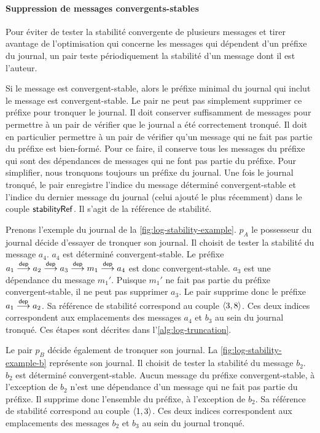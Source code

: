 \paragraph{Suppression de messages convergents-stables}
Pour éviter de tester la stabilité convergente de plusieurs messages et tirer avantage de l'optimisation qui concerne les messages qui dépendent d'un préfixe du journal, un pair teste périodiquement la stabilité d'un message dont il est l'auteur.

Si le message est convergent-stable, alors le préfixe minimal du journal qui inclut le message est convergent-stable.
Le pair ne peut pas simplement supprimer ce préfixe pour tronquer le journal.
Il doit conserver suffisamment de messages pour permettre à un pair de vérifier que le journal a été correctement tronqué.
Il doit en particulier permettre à un pair de vérifier qu'un message qui ne fait pas partie du préfixe est bien-formé.
Pour ce faire, il conserve tous les messages du préfixe qui sont des dépendances de messages qui ne font pas partie du préfixe.
Pour simplifier, nous tronquons toujours un préfixe du journal.
Une fois le journal tronqué, le pair enregistre l'indice du message déterminé convergent-stable et l'indice du dernier message du journal (celui ajouté le plus récemment) dans le couple $\trm{stabilityRef}$.
Il s'agit de la référence de stabilité.

Prenons l'exemple du journal de la \autoref{fig:log-stability-example}.
$p_A$ le possesseur du journal décide d'essayer de tronquer son journal.
Il choisit de tester la stabilité du message $a_4$.
$a_4$ est déterminé convergent-stable.
Le préfixe $a_1 \dep a_2 \dep a_3 \dep m_1 \dep a_4$ est donc convergent-stable.
$a_3$ est une dépendance du message $m_1'$.
Puisque $m_1'$ ne fait pas partie du préfixe convergent-stable, il ne peut pas supprimer $a_3$.
Le pair supprime donc le préfixe $a_1 \dep a_2$.
Sa référence de stabilité correspond au couple $\tuple*{3, 8}$.
Ces deux indices correspondent aux emplacements des messages $a_4$ et $b_3$ au sein du journal tronqué.
Ces étapes sont décrites dans l'\autoref{alg:log-truncation}.

Le pair $p_B$ décide également de tronquer son journal.
La \autoref{fig:log-stability-example-b} représente son journal.
Il choisit de tester la stabilité du message $b_2$.
$b_2$ est déterminé convergent-stable.
Aucun message du préfixe convergent-stable, à l'exception de $b_2$ n'est une dépendance d'un message qui ne fait pas partie du préfixe.
Il supprime donc l'ensemble du préfixe, à l'exception de $b_2$.
Sa référence de stabilité correspond au couple $\tuple*{1, 3}$.
Ces deux indices correspondent aux emplacements des messages $b_2$ et $b_3$ au sein du journal tronqué.

